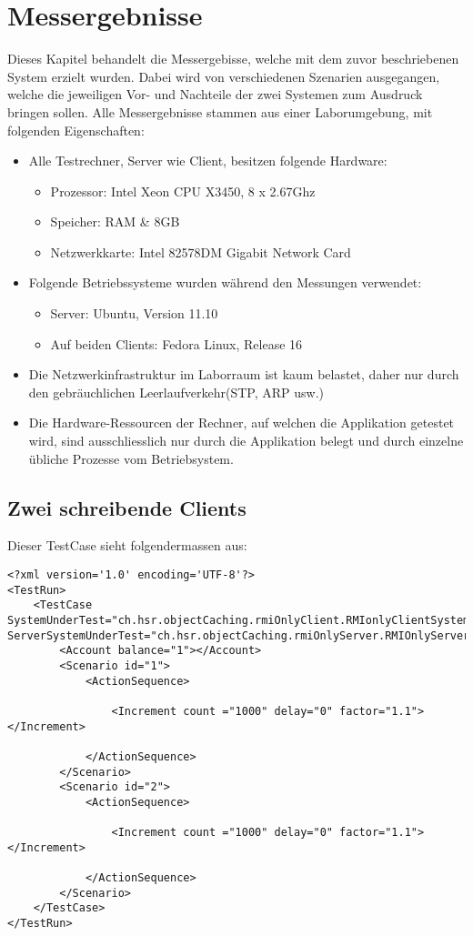 \chapter{Messergebnisse}

Dieses Kapitel behandelt die Messergebisse, welche mit dem zuvor beschriebenen System erzielt wurden. Dabei wird von verschiedenen Szenarien ausgegangen, welche die jeweiligen Vor- und Nachteile der zwei Systemen zum Ausdruck bringen sollen. \newline
Alle Messergebnisse stammen aus einer Laborumgebung, mit folgenden Eigenschaften:
\begin{itemize}
\item Alle Testrechner, Server wie Client, besitzen folgende Hardware:
\begin{itemize}
\item Prozessor: Intel Xeon CPU X3450, 8 x 2.67Ghz
\item Speicher: RAM \& 8GB
\item Netzwerkkarte: Intel 82578DM Gigabit Network Card
\end{itemize}
\item Folgende Betriebssysteme wurden während den Messungen verwendet:
\begin{itemize}
\item Server: Ubuntu, Version 11.10
\item Auf beiden Clients: Fedora Linux, Release 16
\end{itemize}
\item Die Netzwerkinfrastruktur im Laborraum ist kaum belastet, daher nur durch den gebräuchlichen Leerlaufverkehr(STP, ARP usw.)
\item Die Hardware-Ressourcen der Rechner, auf welchen die Applikation getestet wird, sind ausschliesslich nur durch die Applikation belegt und durch einzelne übliche Prozesse vom  Betriebsystem.
\end{itemize}

\section{Zwei schreibende Clients}

Dieser TestCase sieht folgendermassen aus:
\begin{lstlisting}
<?xml version='1.0' encoding='UTF-8'?>
<TestRun>
	<TestCase SystemUnderTest="ch.hsr.objectCaching.rmiOnlyClient.RMIonlyClientSystem" ServerSystemUnderTest="ch.hsr.objectCaching.rmiOnlyServer.RMIOnlyServerSystem">
		<Account balance="1"></Account>
		<Scenario id="1">
			<ActionSequence>

				<Increment count ="1000" delay="0" factor="1.1"></Increment>

			</ActionSequence>
		</Scenario>
		<Scenario id="2">
			<ActionSequence>

				<Increment count ="1000" delay="0" factor="1.1"></Increment>

			</ActionSequence>
		</Scenario>
	</TestCase>
</TestRun>
\end{lstlisting}

